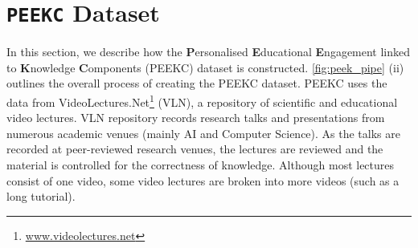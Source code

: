\documentclass[letterpaper]{article} %
\begin{document}

\section{\texttt{PEEKC} Dataset}

In this section, we describe how the \textbf{P}ersonalised \textbf{E}ducational \textbf{E}ngagement linked to \textbf{K}nowledge \textbf{C}omponents (PEEKC) dataset is constructed. \figurename{ \ref{fig:peek_pipe}} (ii) outlines the overall process of creating the PEEKC dataset.
PEEKC uses the data from VideoLectures.Net\footnote{\url{www.videolectures.net}} (VLN), a repository of scientific and educational video lectures. VLN repository records research talks and presentations from numerous academic venues (mainly AI and Computer Science). As the talks are recorded at peer-reviewed research venues, the lectures are reviewed and the material is controlled for the correctness of knowledge. Although most lectures consist of one video, some video lectures are broken into more videos (such as a long tutorial).

\end{document}
